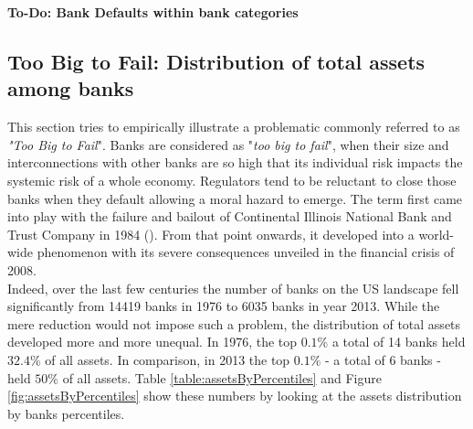 \documentclass[12pt, a4paper]{article} %
\begin{document}
\textbf{To-Do: Bank Defaults within bank categories}

\fi

\newpage

\subsection{Too Big to Fail: Distribution of total assets among banks}
\label{sec:ToBigToFail}

This section tries to empirically illustrate a problematic commonly referred to as \textit{"Too Big to Fail}". 
Banks are considered as "\textit{too big to fail}", when their size and interconnections with other banks are so high that its individual risk impacts the systemic risk of a whole economy. Regulators tend to be reluctant to close those banks when they default allowing a moral hazard to emerge. The term first came into play with the failure and bailout of Continental Illinois National Bank and Trust Company in 1984 (\citet{nurisso20171970s}). From that point onwards, it developed into a world-wide phenomenon with its severe consequences unveiled in the financial crisis of 2008.\\
Indeed, over the last few centuries the number of banks on the US landscape fell significantly from 14419 banks in 1976 to 6035 banks in year 2013. While the mere reduction would not impose such a problem, the distribution of total assets developed more and more unequal. In 1976, the top $0.1\%$ a total of 14 banks held $32.4\%$ of all assets. In comparison, in 2013 the top $0.1\%$ - a total of 6 banks - held $50\%$ of all assets. Table \ref{table:assetsByPercentiles} and Figure \ref{fig:assetsByPercentiles} show these numbers by looking at the assets distribution by banks percentiles.
\end{document}
